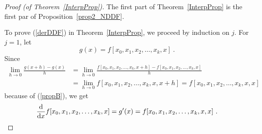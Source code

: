 \begin{proof}[Proof (of Theorem~\ref{InterpProp})]
The first part of Theorem~\ref{InterpProp} is the first par of
Proposition~\ref{prop2_NDDF}.

To prove (\ref{derDDF}) in Theorem~\ref{InterpProp}, we proceed by
induction on $j$.  For $j=1$, let
\[
g(x) = f[x_0,x_1,x_2,\ldots, x_k,x] \ .
\]
Since
\begin{align*}
\lim_{h\rightarrow 0} \frac{g(x+h)-g(x)}{h}
&= \lim_{h\rightarrow 0}
\frac{f[x_0,x_1,x_2,\ldots,x_k,x+h] - f[x_0,x_1,x_2,\ldots, x_k,x]}{h} \\
&= \lim_{h\rightarrow 0} f[x_0,x_1,x_2,\ldots, x_k,x,x+h]
= f[x_0,x_1,x_2,\ldots, x_k,x,x]
\end{align*}
because of (\ref{propB}), we get
\[
\dfdx{f[x_0,x_1,x_2,\ldots, x_k,x]}{x}  = g'(x) =
f[x_0,x_1,x_2,\ldots, x_k,x,x] \ .
\]


\end{proof}
